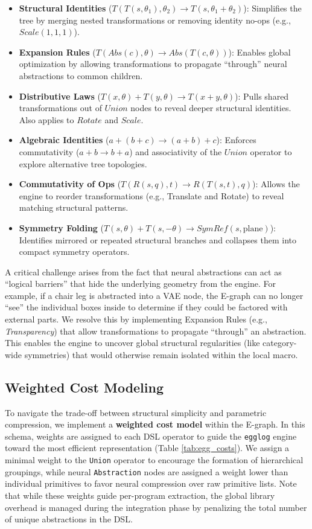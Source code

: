 \documentclass{thesis}
\begin{document}
\begin{itemize}
    \item \textbf{Structural Identities} ($T(T(s, \theta_1), \theta_2) \to T(s, \theta_1 + \theta_2)$): Simplifies the tree by merging nested transformations or removing identity no-ops (e.g., $Scale(1,1,1)$).
    \item \textbf{Expansion Rules} ($T(Abs(c), \theta) \to Abs(T(c, \theta))$): Enables global optimization by allowing transformations to propagate ``through'' neural abstractions to common children.
    \item \textbf{Distributive Laws} ($T(x, \theta) + T(y, \theta) \to T(x + y, \theta)$): Pulls shared transformations out of $Union$ nodes to reveal deeper structural identities. Also applies to $Rotate$ and $Scale$.
    \item \textbf{Algebraic Identities} ($a + (b + c) \to (a + b) + c$): Enforces commutativity ($a+b \to b+a$) and associativity of the $Union$ operator to explore alternative tree topologies.
    \item \textbf{Commutativity of Ops} ($T(R(s, q), t) \to R(T(s, t), q)$): Allows the engine to reorder transformations (e.g., Translate and Rotate) to reveal matching structural patterns.
    \item \textbf{Symmetry Folding} ($T(s, \theta) + T(s, -\theta) \to SymRef(s, \text{plane})$): Identifies mirrored or repeated structural branches and collapses them into compact symmetry operators.
\end{itemize}

A critical challenge arises from the fact that neural abstractions can act as ``logical barriers'' that hide the underlying geometry from the engine. For example, if a chair leg is abstracted into a VAE node, the E-graph can no longer ``see'' the individual boxes inside to determine if they could be factored with external parts. We resolve this by implementing Expansion Rules (e.g., \textit{Transparency}) that allow transformations to propagate ``through'' an abstraction. This enables the engine to uncover global structural regularities (like category-wide symmetries) that would otherwise remain isolated within the local macro.

\subsection{Weighted Cost Modeling}

To navigate the trade-off between structural simplicity and parametric compression, we implement a \textbf{weighted cost model} within the E-graph. In this schema, weights are assigned to each DSL operator to guide the \texttt{egglog} engine toward the most efficient representation (Table \ref{tab:egg_costs}). We assign a minimal weight to the \texttt{Union} operator to encourage the formation of hierarchical groupings, while neural \texttt{Abstraction} nodes are assigned a weight lower than individual primitives to favor neural compression over raw primitive lists. Note that while these weights guide per-program extraction, the global library overhead is managed during the integration phase by penalizing the total number of unique abstractions in the DSL.
\end{document}
